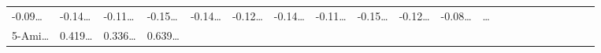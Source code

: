 \documentclass[
]{article}
\begin{document}
\begin{longtable}[]{@{}lllllllllllllllllllll@{}}
\begin{minipage}[t]{0.03\columnwidth}
-0.09\ldots{}\strut
\end{minipage} & \begin{minipage}[t]{0.03\columnwidth}\raggedright
-0.14\ldots{}\strut
\end{minipage} & \begin{minipage}[t]{0.03\columnwidth}\raggedright
-0.11\ldots{}\strut
\end{minipage} & \begin{minipage}[t]{0.03\columnwidth}\raggedright
-0.15\ldots{}\strut
\end{minipage} & \begin{minipage}[t]{0.03\columnwidth}\raggedright
-0.14\ldots{}\strut
\end{minipage} & \begin{minipage}[t]{0.03\columnwidth}\raggedright
-0.12\ldots{}\strut
\end{minipage} & \begin{minipage}[t]{0.03\columnwidth}\raggedright
-0.14\ldots{}\strut
\end{minipage} & \begin{minipage}[t]{0.03\columnwidth}\raggedright
-0.11\ldots{}\strut
\end{minipage} & \begin{minipage}[t]{0.03\columnwidth}\raggedright
-0.15\ldots{}\strut
\end{minipage} & \begin{minipage}[t]{0.03\columnwidth}\raggedright
-0.12\ldots{}\strut
\end{minipage} & \begin{minipage}[t]{0.03\columnwidth}\raggedright
-0.08\ldots{}\strut
\end{minipage} & \begin{minipage}[t]{0.01\columnwidth}\raggedright
\ldots{}\strut
\end{minipage}\tabularnewline
\begin{minipage}[t]{0.03\columnwidth}\raggedright
5-Ami\ldots{}\strut
\end{minipage} & \begin{minipage}[t]{0.03\columnwidth}\raggedright
0.419\ldots{}\strut
\end{minipage} & \begin{minipage}[t]{0.03\columnwidth}\raggedright
0.336\ldots{}\strut
\end{minipage} & \begin{minipage}[t]{0.03\columnwidth}\raggedright
0.639\ldots{}\strut
\end{minipage} & \begin{minipage}[t]{0.03\columnwidth}\raggedright

\end{minipage}
\end{longtable}
\end{document}
